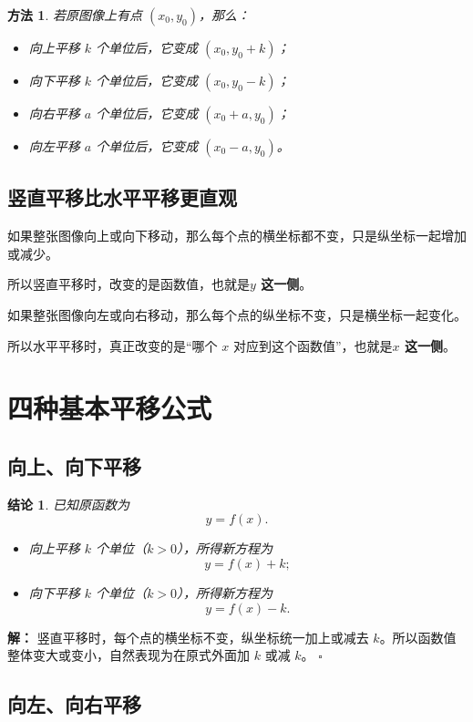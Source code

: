 \documentclass[11pt,a4paper,fontset=fandol]{ctexart}
\theoremstyle{formaltheorem}
\newtheorem{theorem}{结论}[section]
\newtheorem{method}{方法}[section]
\theoremstyle{formalexample}
\newenvironment{solution}{\par\noindent\textbf{解：}}{\hfill$\square$\par}
\begin{document}
\begin{method}
若原图像上有点 $(x_0,y_0)$，那么：
\begin{itemize}
  \item 向上平移 $k$ 个单位后，它变成 $(x_0,y_0+k)$；
  \item 向下平移 $k$ 个单位后，它变成 $(x_0,y_0-k)$；
  \item 向右平移 $a$ 个单位后，它变成 $(x_0+a,y_0)$；
  \item 向左平移 $a$ 个单位后，它变成 $(x_0-a,y_0)$。
\end{itemize}
\end{method}

\subsection{竖直平移比水平平移更直观}
如果整张图像向上或向下移动，那么每个点的横坐标都不变，只是纵坐标一起增加或减少。

所以竖直平移时，改变的是函数值，也就是\textbf{$y$ 这一侧}。

如果整张图像向左或向右移动，那么每个点的纵坐标不变，只是横坐标一起变化。

所以水平平移时，真正改变的是“哪个 $x$ 对应到这个函数值”，也就是\textbf{$x$ 这一侧}。

\section{四种基本平移公式}

\subsection{向上、向下平移}

\begin{theorem}
已知原函数为
\[
y=f(x).
\]
\begin{itemize}
  \item 向上平移 $k$ 个单位（$k>0$），所得新方程为
  \[
  y=f(x)+k;
  \]
  \item 向下平移 $k$ 个单位（$k>0$），所得新方程为
  \[
  y=f(x)-k.
  \]
\end{itemize}
\end{theorem}

\begin{solution}
竖直平移时，每个点的横坐标不变，纵坐标统一加上或减去 $k$。所以函数值整体变大或变小，自然表现为在原式外面加 $k$ 或减 $k$。
\end{solution}

\subsection{向左、向右平移}
\end{document}

